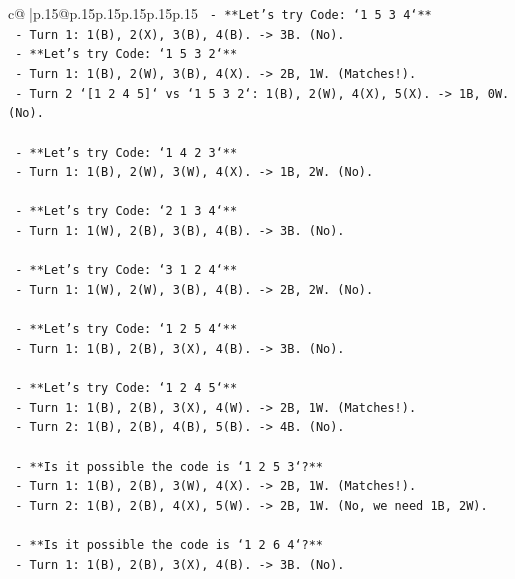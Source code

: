 \documentclass{article}
\begin{document}
{\begin{supertabular}{c@{$\;$}|p{.15\linewidth}@{}p{.15\linewidth}p{.15\linewidth}p{.15\linewidth}p{.15\linewidth}p{.15\linewidth}}
{{{\texttt{    {-} **Let's try Code: `1 5 3 4`**} \\
\texttt{        {-} Turn 1: 1(B), 2(X), 3(B), 4(B). {-}> 3B. (No).} \\
\texttt{    {-} **Let's try Code: `1 5 3 2`**} \\
\texttt{        {-} Turn 1: 1(B), 2(W), 3(B), 4(X). {-}> 2B, 1W. (Matches!).} \\
\texttt{        {-} Turn 2 `{[}1 2 4 5{]}` vs `1 5 3 2`: 1(B), 2(W), 4(X), 5(X). {-}> 1B, 0W. (No).} \\
\\ 
\texttt{    {-} **Let's try Code: `1 4 2 3`**} \\
\texttt{        {-} Turn 1: 1(B), 2(W), 3(W), 4(X). {-}> 1B, 2W. (No).} \\
\\ 
\texttt{    {-} **Let's try Code: `2 1 3 4`**} \\
\texttt{        {-} Turn 1: 1(W), 2(B), 3(B), 4(B). {-}> 3B. (No).} \\
\\ 
\texttt{    {-} **Let's try Code: `3 1 2 4`**} \\
\texttt{        {-} Turn 1: 1(W), 2(W), 3(B), 4(B). {-}> 2B, 2W. (No).} \\
\\ 
\texttt{    {-} **Let's try Code: `1 2 5 4`**} \\
\texttt{        {-} Turn 1: 1(B), 2(B), 3(X), 4(B). {-}> 3B. (No).} \\
\\ 
\texttt{    {-} **Let's try Code: `1 2 4 5`**} \\
\texttt{        {-} Turn 1: 1(B), 2(B), 3(X), 4(W). {-}> 2B, 1W. (Matches!).} \\
\texttt{        {-} Turn 2: 1(B), 2(B), 4(B), 5(B). {-}> 4B. (No).} \\
\\ 
\texttt{    {-} **Is it possible the code is `1 2 5 3`?**} \\
\texttt{        {-} Turn 1: 1(B), 2(B), 3(W), 4(X). {-}> 2B, 1W. (Matches!).} \\
\texttt{        {-} Turn 2: 1(B), 2(B), 4(X), 5(W). {-}> 2B, 1W. (No, we need 1B, 2W).} \\
\\ 
\texttt{    {-} **Is it possible the code is `1 2 6 4`?**} \\
\texttt{        {-} Turn 1: 1(B), 2(B), 3(X), 4(B). {-}> 3B. (No).} \\
\\ 
}}}
\end{supertabular}}
\end{document}
